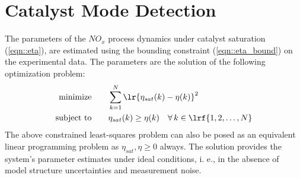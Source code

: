 \section{Catalyst Mode Detection}
The parameters of the $NO_x$ process dynamics under catalyst saturation (\ref{eqn::eta}), are estimated using the bounding constraint (\ref{eqn::eta_bound}) on the experimental data. The parameters are the solution of the following optimization problem:
\begin{align}
\text{minimize} &\qquad \sum_{k=1}^{N} \lr{ \eta_{sat}(k) - \eta(k)} ^2 \\
\text{subject to} &\qquad \eta_{sat}(k) \geq \eta(k) \quad \forall \, k \in \lrf{1,2,\hdots, N} \notag
\end{align}
The above constrained least-squares problem can also be posed as an equivalent linear programming problem as $\eta_{sat}, \eta \geq 0$ always. The solution provides the system's parameter estimates under ideal conditions, i.
e., in the absence of model structure uncertainties and measurement noise.
